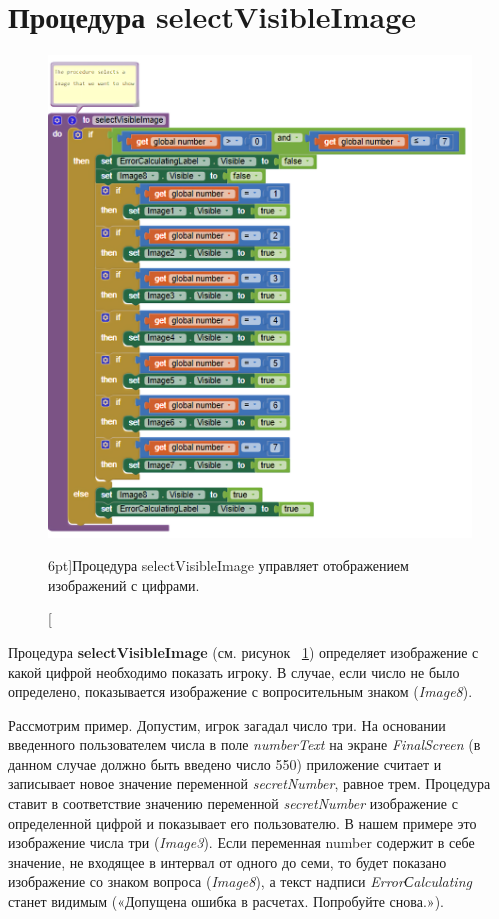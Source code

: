 \section{Процедура selectVisibleImage}

\begin{figure}
  \includegraphics{./graphics/programs/guess_numbers/procedure_selectVisibleImage_AppInventor_2018.png}
    \caption[Процедура selectVisibleImage.][6pt]{Процедура selectVisibleImage управляет отображением изображений с цифрами.}
  \label{fig:block:click:select:visible:image}
\end{figure}

Процедура \textbf{selectVisibleImage} (см. рисунок ~\ref{fig:block:click:select:visible:image}) определяет изображение с какой цифрой необходимо показать игроку.
В случае, если число не было определено, показывается изображение с вопросительным знаком (\textit{Image8}).

Рассмотрим пример. Допустим, игрок загадал число три. На основании введенного пользователем числа в поле \textit{numberText} на экране \textit{FinalScreen} (в данном случае должно быть введено число 550) приложение считает и записывает новое значение переменной \textit{secretNumber}, равное трем. Процедура ставит в соответствие значению переменной \textit{secretNumber} изображение с определенной цифрой и показывает его пользователю. 
В нашем примере это изображение числа три (\textit{Image3}). Если переменная number содержит в себе значение, не входящее в интервал от одного до семи, то будет показано изображение со знаком вопроса (\textit{Image8}), а текст надписи \textit{ErrorСalculating} станет видимым («Допущена ошибка в расчетах. Попробуйте снова.»).

